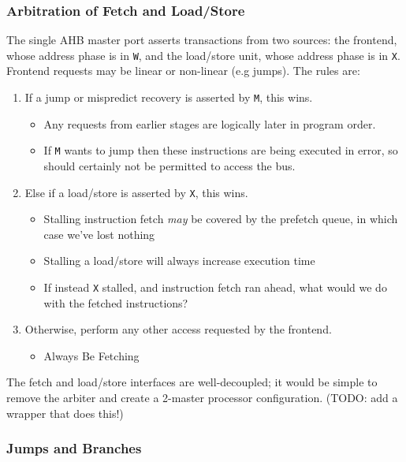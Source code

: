 \documentclass[notitlepage]{article}
\begin{document}
\subsubsection{Arbitration of Fetch and Load/Store}
\label{section:fetch_ls_arb}

The single AHB master port asserts transactions from two sources: the frontend, whose address phase is in {\tt W}, and the load/store unit, whose address phase is in {\tt X}. Frontend requests may be linear or non-linear (e.g jumps). The rules are:

\begin{enumerate}
	\item If a jump or mispredict recovery is asserted by {\tt M}, this wins.
	\begin{itemize}
		\item Any requests from earlier stages are logically later in program order.
		\item If {\tt M} wants to jump then these instructions are being executed in error, so should certainly not be permitted to access the bus.
	\end{itemize}
	\item Else if a load/store is asserted by {\tt X}, this wins.
	\begin{itemize}
		\item Stalling instruction fetch {\it may} be covered by the prefetch queue, in which case we've lost nothing
		\item Stalling a load/store will always increase execution time
		\item If instead {\tt X} stalled, and instruction fetch ran ahead, what would we do with the fetched instructions?
	\end{itemize}
	\item Otherwise, perform any other access requested by the frontend.
	\begin{itemize}
		\item Always Be Fetching
	\end{itemize}
\end{enumerate}

The fetch and load/store interfaces are well-decoupled; it would be simple to remove the arbiter and create a 2-master processor configuration. (TODO: add a wrapper that does this!)

\subsubsection{Jumps and Branches}
\end{document}
